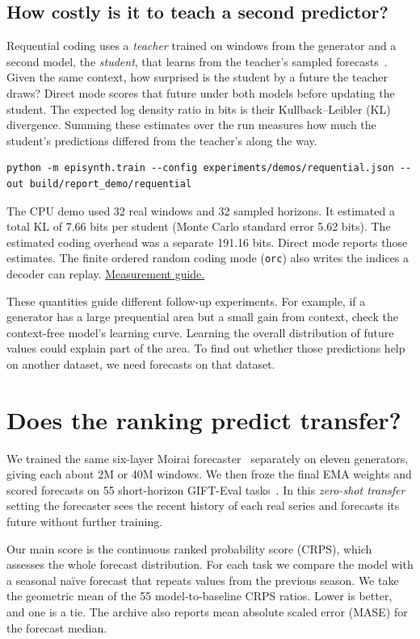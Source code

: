 \documentclass[11pt,a4paper]{article}
\newcommand{\repolink}[2]{\href{https://github.com/intsystems/Epiplexity/blob/main/#1}{#2}}
\begin{document}
\subsection{How costly is it to teach a second predictor?}\label{sec:requential}
Requential coding uses a \emph{teacher} trained on windows from the
generator and a second model, the \emph{student}, that learns from the
teacher's sampled forecasts~\cite{qiu2026}. Given the same context, how
surprised is the student by a future the teacher draws? Direct mode scores
that future under both models before updating the student. The expected
log density ratio in bits is their Kullback--Leibler (KL) divergence.
Summing these estimates over the run measures how much the student's
predictions differed from the teacher's along the way.
\begin{lstlisting}
python -m episynth.train --config experiments/demos/requential.json --out build/report_demo/requential
\end{lstlisting}
The CPU demo used 32 real windows and 32 sampled horizons. It estimated a
total KL of 7.66 bits per student (Monte Carlo standard error 5.62 bits).
The estimated coding overhead was a separate 191.16 bits. Direct mode
reports those estimates. The finite ordered random coding mode
(\texttt{orc}) also writes the indices a decoder can replay.
\repolink{doc/source/measurements.rst}{Measurement guide.}

These quantities guide different follow-up experiments. For example, if a
generator has a large prequential area but a small gain from context, check
the context-free model's learning curve. Learning the overall distribution
of future values could explain part of the area. To find out whether those
predictions help on another dataset, we need forecasts on that dataset.

\clearpage
\section{Does the ranking predict transfer?}\label{sec:transfer}
We trained the same six-layer Moirai forecaster~\cite{woo2024} separately
on eleven generators, giving each about 2M or 40M windows. We then froze
the final EMA weights and scored forecasts on 55 short-horizon GIFT-Eval
tasks~\cite{aksu2024}. In this \emph{zero-shot transfer} setting the forecaster
sees the recent history of each real series and forecasts its future
without further training.

Our main score is the continuous ranked probability score (CRPS), which
assesses the whole forecast distribution. For each task we compare the
model with a seasonal na\"ive forecast that repeats values from the previous
season. We take the geometric mean of the 55 model-to-baseline CRPS ratios.
Lower is better, and one is a tie. The archive also reports mean absolute
scaled error (MASE) for the forecast median.
\end{document}
